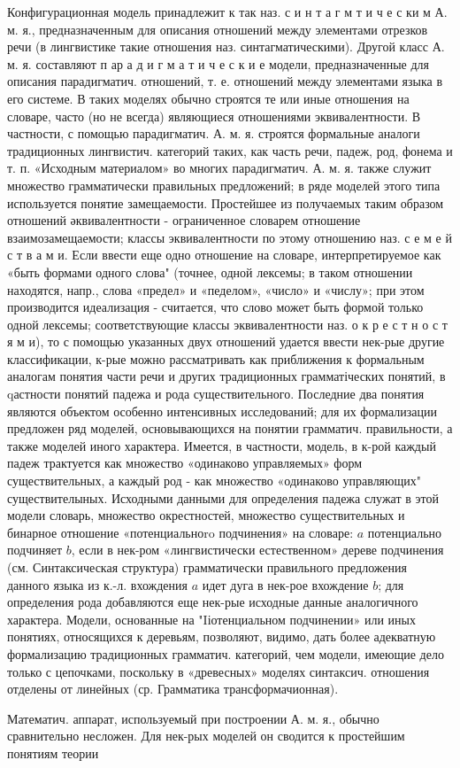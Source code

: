 \documentclass[10pt]{article}
\begin{document}
Конфигурационная модель принадлежит к так наз. с и н т а г м т и ч е с ки м А. м. я., предназначенным для описания отношений между элементами отрезков речи (в лингвистике такие отношения наз. синтагматическими). Другой класс А. м. я. составляют п ар а д и г м а т и ч е с к и е модели, предназначенные для описания парадигматич. отношений, т. е. отношений между элементами языка в его системе. В таких моделях обычно строятся те или иные отношения на словаре, часто (но не всегда) являющиеся отношениями эквивалентности. В частности, с помощью парадигматич. А. м. я. строятся формальные аналоги традиционных лингвистич. категорий таких, как часть речи, падеж, род, фонема и т. п. «Исходным материалом» во многих парадигматич. А. м. я. также служит множество грамматически правильных предложений; в ряде моделей этого типа используется понятие замещаемости. Простейшее из получаемых таким образом отношений әквивалентности - ограниченное словарем отношение взаимозамещаемости; классы эквивалентности по этому отношению наз. с е м е й с т в а м и. Если ввести еще одно отношение на словаре, интерпретируемое как «быть формами одного слова" (точнее, одной лексемы; в таком отношении находятся, напр., слова «предел» и «педелом», «число» и «числу»; при этом производится идеализация - считается, что слово может быть формой только одной лексемы; соответствующие классы эквивалентности наз. о к р е с т н о с т я м и), то с помощью указанных двух отношений удается ввести нек-рые другие классификации, к-рые можно рассматривать как приближения к формальным аналогам понятия части речи и других традиционных грамматіческих понятий, в qастности понятий падежа и рода существительного. Последние два понятия являются объектом особенно интенсивных исследований; для их формализации предложен ряд моделей, основывающихся на понятии грамматич. правильности, а также моделей иного характера. Имеется, в частности, модель, в к-рой каждый падеж трактуется как множество «одинаково управляемых» форм существительных, а каждый род - как множество «одинаково управляющих" существителыных. Исходными данными для определения падежа служат в этой модели словарь, множество окрестностей, множество существительных и бинарное отношение «потенциальноro подчинения» на словаре: $a$ потенциально подчиняет $b$, если в нек-ром «лингвистически естественном» дереве подчинения (см. Синтаксическая структура) грамматически правильного предложения данного языка из к.-л. вхождения $a$ идет дуга в нек-рое вхождение $b$; для определения рода добавляются еще нек-рые исходные данные аналогичного характера. Модели, основанные на "Iіотенциальном подчинении» или иных понятиях, относящихся к деревьям, позволяют, видимо, дать более адекватную формализацию традиционных грамматич. категорий, чем модели, имеющие дело только с цепочками, поскольку в «древесных» моделях синтаксич. отношения отделены от линейных (ср. Грамматика трансформачионная).



Математич. аппарат, используемый при построении А. м. я., обычно сравнительно несложен. Для нек-рых моделей он сводится к простейшим понятиям теории
\end{document}
